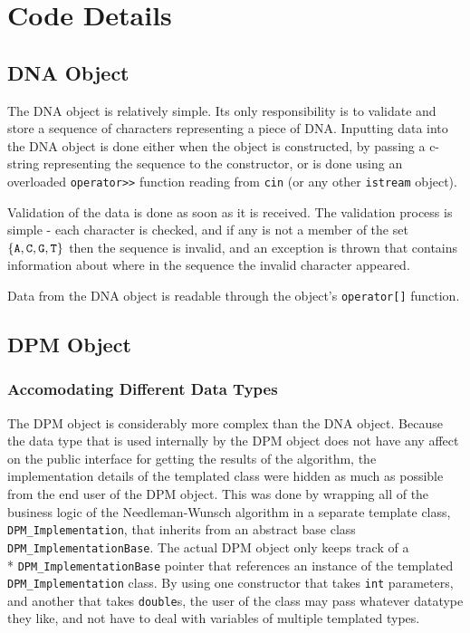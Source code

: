 \documentclass[a4paper]{report}
\begin{document}
\section*{Code Details}
\subsection*{DNA Object}

The DNA object is relatively simple. Its only responsibility is to validate
and store a sequence of characters representing a piece of DNA. Inputting
data into the DNA object is done either when the object is constructed, by
passing a c-string representing the sequence to the constructor, or is done
using an overloaded \verb=operator>>= function reading from \verb=cin= (or any other \verb=istream=
 object).

Validation of the data is done as soon as it is received. The validation
process is simple - each character is checked, and if any is not a member
of the set $\{\verb=A=,\verb=C=,\verb=G=,\verb=T=\}$ then the sequence is
invalid, and an exception is thrown that contains information about where in the
sequence the invalid character appeared.

Data from the DNA object is readable through the object's \verb=operator[]= function.

\subsection*{DPM Object}

\subsubsection*{Accomodating Different Data Types}

The DPM object is considerably more complex than the DNA object. Because the
data type that is used internally by the DPM object does not have any affect
on the public interface for getting the results of the algorithm, the
implementation details of the templated class were hidden as much as possible
from the end user of the DPM object. This was done by wrapping all of
the business logic of the Needleman-Wunsch algorithm in a separate template class,
\verb=DPM_Implementation=, that inherits from an abstract base class \verb=DPM_ImplementationBase=.
The actual DPM object only keeps track of a \\* \verb=DPM_ImplementationBase= pointer
that references an instance of the templated \verb=DPM_Implementation= class. By
using one constructor that takes \verb=int= parameters, and another that takes \verb=double=s,
the user of the class may pass whatever datatype they like, and not have to deal
with variables of multiple templated types.
\end{document}
